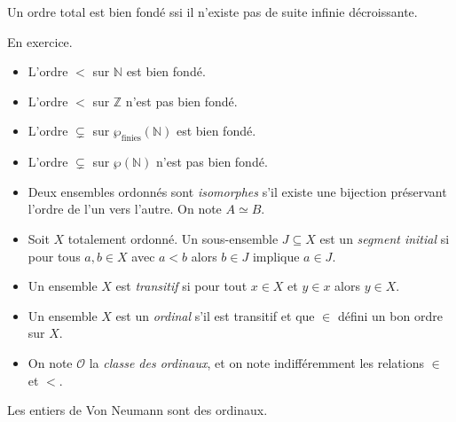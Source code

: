 \documentclass[./main]{subfiles}
\begin{document}
  \begin{prop}
    Un ordre total est bien fondé ssi il n'existe pas de suite infinie décroissante.
  \end{prop}
  \begin{prv}
    En exercice.
  \end{prv}

  \begin{exm}
    \begin{itemize}
      \item L'ordre $<$ sur $\mathds{N}$ est bien fondé.
      \item L'ordre $<$ sur $\mathds{Z}$ n'est pas bien fondé.
      \item L'ordre $\subsetneq $ sur $\wp_\mathrm{finies}(\mathds{N})$ est bien fondé.
      \item L'ordre $\subsetneq $ sur $\wp(\mathds{N})$ n'est pas bien fondé.
    \end{itemize}
  \end{exm}

  \begin{defn}
    \begin{itemize}
      \item Deux ensembles ordonnés sont \textit{isomorphes} s'il existe une bijection préservant l'ordre de l'un vers l'autre.
        On note $A \simeq B$.
      \item Soit $X$ totalement ordonné. Un sous-ensemble $J \subseteq X$ est un \textit{segment initial} si pour tous $a,b \in X$ avec $a < b$ alors $b \in J$ implique $a \in J$.
      \item Un ensemble $X$ est \textit{transitif} si pour tout $x \in X$ et $y \in x$ alors $y \in X$.
      \item Un ensemble $X$ est un \textit{ordinal} s'il est transitif  et que $\in$ défini un bon ordre sur $X$.
      \item On note $\mathcal{O}$ la \textit{classe des ordinaux}, et on note indifféremment les relations $\in$ et $<$.
    \end{itemize}
  \end{defn}

  \begin{exm}
    Les entiers de Von Neumann sont des ordinaux.
  \end{exm}
\end{document}
